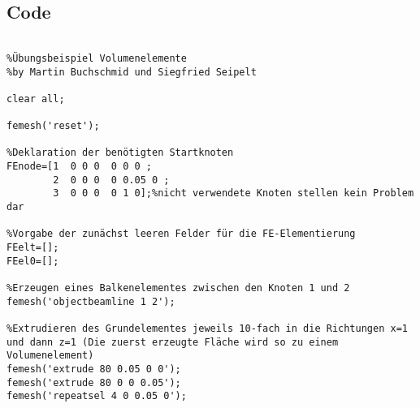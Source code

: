 \newpage 
\subsection{Code}
\label{sec:code}


\begin{lstlisting}[style=matlab,
  label=lst:prozess,
  firstnumber=1,
  float={!htb},
  caption={Ein Matlab-Programm}
  ]
  
%Übungsbeispiel Volumenelemente
%by Martin Buchschmid und Siegfried Seipelt

clear all;

femesh('reset');

%Deklaration der benötigten Startknoten
FEnode=[1  0 0 0  0 0 0 ;
        2  0 0 0  0 0.05 0 ;
        3  0 0 0  0 1 0];%nicht verwendete Knoten stellen kein Problem dar
         
%Vorgabe der zunächst leeren Felder für die FE-Elementierung															   
FEelt=[];
FEel0=[];

%Erzeugen eines Balkenelementes zwischen den Knoten 1 und 2
femesh('objectbeamline 1 2');

%Extrudieren des Grundelementes jeweils 10-fach in die Richtungen x=1 und dann z=1 (Die zuerst erzeugte Fläche wird so zu einem Volumenelement)
femesh('extrude 80 0.05 0 0');
femesh('extrude 80 0 0 0.05');
femesh('repeatsel 4 0 0.05 0');


\end{lstlisting}